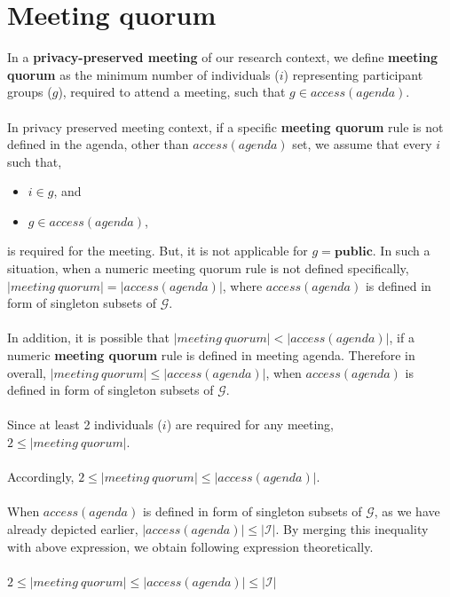 \documentclass{article}
\begin{document}
\section{Meeting quorum}
\noindent
In a \textbf{privacy-preserved meeting} of our research context, we define \textbf{meeting quorum} as the minimum number of individuals ($i$) representing participant groups ($g$), required to attend a meeting, such that $g \in access(agenda)$. \\ \\
In privacy preserved meeting context, if a specific \textbf{meeting quorum} rule is not defined in the agenda, other than $access(agenda)$ set, we assume that every $i$ such that, 
\begin{itemize}
    \item $i \in g$, and
    \item $g \in access(agenda)$, 
\end{itemize}
\noindent
is required for the meeting. But, it is not applicable for $g = \textbf{public}$. In such a situation, when a numeric meeting quorum rule is not defined specifically, $|meeting\ quorum| = |access(agenda)|$, where $access(agenda)$ is defined in form of singleton subsets of $\mathcal{G}$. \\ \\
\noindent
In addition, it is possible that $|meeting\ quorum| < |access(agenda)|$, if a numeric \textbf{meeting quorum} rule is defined in meeting agenda. Therefore in overall, $|meeting\ quorum| \leq |access(agenda)|$, when $access(agenda)$ is defined in form of singleton subsets of $\mathcal{G}$. \\ \\
Since at least 2 individuals ($i$) are required for any meeting, $2 \leq |meeting\ quorum|$. \\ \\
Accordingly, $2 \leq |meeting\ quorum| \leq |access(agenda)|$. \\ \\
When $access(agenda)$ is defined in form of singleton subsets of $\mathcal{G}$, as we have already depicted earlier, $|access(agenda)| \leq |\mathcal{I}|$. By merging this inequality with above expression, we obtain following expression theoretically.\\ \\
$2 \leq |meeting\ quorum| \leq |access(agenda)| \leq |\mathcal{I}|$  \\ \\
\end{document}
